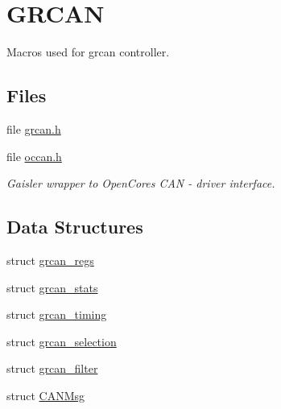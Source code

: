 \hypertarget{group__can}{}\section{G\+R\+C\+AN}
\label{group__can}


Macros used for grcan controller.  


\subsection*{Files}
\begin{DoxyCompactItemize}
\item 
file \mbox{\hyperlink{grcan_8h}{grcan.\+h}}
\item 
file \mbox{\hyperlink{occan_8h}{occan.\+h}}
\begin{DoxyCompactList}\small\item\em Gaisler wrapper to Open\+Cores C\+AN -\/ driver interface. \end{DoxyCompactList}\end{DoxyCompactItemize}
\subsection*{Data Structures}
\begin{DoxyCompactItemize}
\item 
struct \mbox{\hyperlink{structgrcan__regs}{grcan\+\_\+regs}}
\item 
struct \mbox{\hyperlink{structgrcan__stats}{grcan\+\_\+stats}}
\item 
struct \mbox{\hyperlink{structgrcan__timing}{grcan\+\_\+timing}}
\item 
struct \mbox{\hyperlink{structgrcan__selection}{grcan\+\_\+selection}}
\item 
struct \mbox{\hyperlink{structgrcan__filter}{grcan\+\_\+filter}}
\item 
struct \mbox{\hyperlink{structCANMsg}{C\+A\+N\+Msg}}
\end{DoxyCompactItemize}
